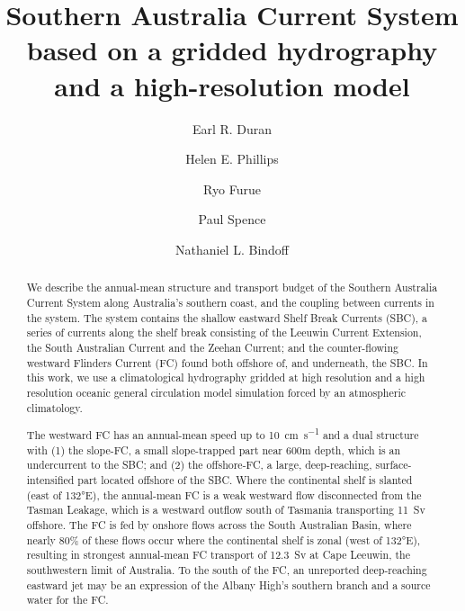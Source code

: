 \documentclass[preprint,3p,review,12pt]{elsarticle}
\begin{document}
\begin{frontmatter}

\title{Southern Australia Current System based on a gridded hydrography and a high-resolution model}

\author[label2]{Earl R. Duran}
\author[label3,label4]{Helen E. Phillips}
\author[label5]{Ryo Furue}
\author[label2,label4]{Paul Spence}
\author[label3,label4,label6,label7]{Nathaniel L. Bindoff}

\address[label2]{Climate Change Research Centre (CCRC), University of New South Wales, Sydney, NSW 2052 Australia}
\address[label3]{Institute for Marine and Antarctic Studies (IMAS), Hobart, Tasmania, Australia}
\address[label4]{ARC Centre of Excellence for Climate Extremes (CLEX)}\address[label5]{Japan Agency for Marine-Earth Science and Technology (JAMSTEC), Yokohama, Japan}
\address[label6]{Commonwealth Scientific and Industrial Research Organisation (CSIRO)}
\address[label7]{Antarctic Climate and Ecosystems Cooperative Research Centre (ACE CRC), Hobart, Tasmania, Australia}


\begin{abstract}
We describe the annual-mean structure and transport budget of the Southern Australia Current System along Australia's southern coast, and the coupling between currents in the system. The system contains the shallow eastward Shelf Break Currents (SBC), a series of currents along the shelf break consisting of the Leeuwin Current Extension, the South Australian Current and the Zeehan Current; and the counter-flowing westward Flinders Current (FC) found both offshore of, and underneath, the SBC\@.
In this work, we use a climatological hydrography gridded at high resolution and a high resolution oceanic general circulation model simulation forced by an atmospheric climatology.

The westward FC has an annual-mean speed up to \SI{10}{\centi\meter\per\second} and a dual structure with (1) the slope-FC, a small slope-trapped part near 600m depth, which is an undercurrent to the SBC; and (2) the offshore-FC, a large, deep-reaching, surface-intensified part located offshore of the SBC\@.
Where the continental shelf is slanted (east of \ang{132}E), the annual-mean FC is a weak westward flow disconnected from the Tasman Leakage, which is a westward outflow south of Tasmania transporting \SI{11}{Sv} offshore.
The FC is fed by onshore flows across the South Australian Basin, where nearly 80\% of these flows occur where the continental shelf is zonal (west of \ang{132}E), resulting in strongest annual-mean FC transport of \SI{12.3}{Sv} at Cape Leeuwin, the southwestern limit of Australia.
To the south of the FC, an unreported deep-reaching eastward jet may be an expression of the Albany High's southern branch and a source water for the FC.


\end{abstract}
\end{frontmatter}
\end{document}
